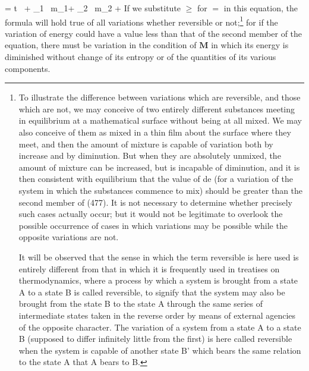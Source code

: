\documentclass[12pt]{article}
\begin{document}
{\eqs \delta \epsilon = t \, \delta \eta + \mu_1 \, \delta m_1+ \mu_2 \, \delta m_2 +  \label{477} \eqe
If we substitute $\geq$ for $=$ in this equation, the formula will hold true of all variations whether reversible or not;\footnote{To illustrate the difference between variations which are reversible, and those which are not, we may conceive of two entirely different substances meeting in equilibrium at a mathematical surface without being at all mixed. We may also conceive of them as mixed in a thin film about the surface where they meet, and then the amount of mixture is capable of variation both by increase and by diminution. But when they are absolutely unmixed, the amount of mixture can be increased, but is incapable of diminution, and it is then consistent with equilibrium that the value of de (for a variation of the system in which the substances commence to mix) should be greater than the second member of (477). It is not necessary to determine whether precisely such cases actually occur; but it would not be legitimate to overlook the possible occurrence of cases in which variations may be possible while the opposite variations are not.\par
It will be observed that the sense in which the term reversible is here used is entirely different from that in which it is frequently used in treatises on thermodynamics, where a process by which a system is brought from a state A to a state B is called reversible, to signify that the system may also be brought from the state B to the state A through the same series of intermediate states taken in the reverse order by means of external agencies of the opposite character. The variation of a system from a state A to a state B (supposed to differ infinitely little from the first) is here called reversible when the system is capable of another state B' which bears the same relation to the state A that A bears to B.} %
for if the variation of energy could have a value less than that of the second member of the equation, there must be variation in the condition of $\mathbf{M}$ in which its energy is diminished without change of its entropy or of the quantities of its various components.


}
\end{document}
